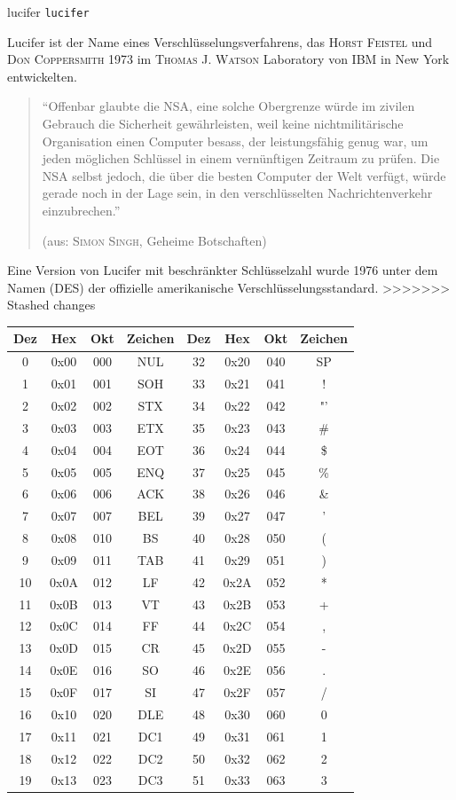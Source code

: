 \documentclass[%
<<<<<<< Updated upstream
11pt,%
twoside,%
titlepage,%
german,%
headsepline%
]{scrartcl}
\begin{document}
\begin{lsg}{lucifer}
    \texttt{lucifer}
\end{lsg}

Lucifer ist der Name eines Ver\-schlüs\-se\-lungs\-ver\-fahrens, das \textsc{Horst Feistel} und \textsc{Don Coppersmith} 1973 im \textsc{Thomas J. Watson} Laboratory von IBM in New York entwickelten.

\begin{quote}
\enquote{Offenbar glaubte die NSA, eine solche Obergrenze würde im zivilen Gebrauch die Sicherheit gewährleisten, weil keine nichtmilitärische Organisation einen Computer besass, der leistungsfähig genug war, um jeden möglichen Schlüssel in einem vernünftigen Zeitraum zu prüfen. Die NSA selbst jedoch, die über die besten Computer der Welt verfügt, würde gerade noch in der Lage sein, in den verschlüsselten Nachrichtenverkehr einzubrechen.}

(aus: \textsc{Simon Singh}, Geheime Botschaften)
\end{quote}

Eine Version von Lucifer mit beschränkter Schlüsselzahl wurde 1976 unter dem Namen  (DES) der offizielle amerikanische Verschlüsselungsstandard.
>>>>>>> Stashed changes

\begin{longtable}{|c|c|c|c||c|c|c|c|}
\hline
Dez & Hex & Okt & Zeichen & Dez & Hex & Okt & Zeichen\\
\hline
0 & 0x00 & 000 & NUL & 32 & 0x20 & 040 & SP\\
1 & 0x01 & 001 & SOH & 33 & 0x21 & 041 & ! \\
2 & 0x02 & 002 & STX & 34 & 0x22 & 042 & "'\\
3 & 0x03 & 003 & ETX & 35 & 0x23 & 043 & \# \\
4 & 0x04 & 004 & EOT & 36 & 0x24 & 044 & \$ \\
5 & 0x05 & 005 & ENQ & 37 & 0x25 & 045 & \% \\
6 & 0x06 & 006 & ACK & 38 & 0x26 & 046 & \& \\
7 & 0x07 & 007 & BEL & 39 & 0x27 & 047 & ' \\
8 & 0x08 & 010 & BS & 40 & 0x28 & 050 & (  \\
9 & 0x09 & 011 & TAB & 41 & 0x29 & 051 &  ) \\
10 & 0x0A & 012 & LF & 42 & 0x2A & 052 & * \\
11 & 0x0B & 013 & VT & 43 & 0x2B & 053 & + \\
12 & 0x0C & 014 & FF & 44 & 0x2C & 054 & , \\
13 & 0x0D & 015 & CR & 45 & 0x2D & 055 & - \\
14 & 0x0E & 016 & SO & 46 & 0x2E & 056 & . \\
15 & 0x0F & 017 & SI & 47 & 0x2F & 057 & / \\
16 & 0x10 & 020 & DLE & 48 & 0x30 & 060 & 0 \\
17 & 0x11 & 021 & DC1 & 49 & 0x31 & 061 & 1 \\
18 & 0x12 & 022 & DC2 & 50 & 0x32 & 062 & 2 \\
19 & 0x13 & 023 & DC3 & 51 & 0x33 & 063 & 3 \\
\hline
\end{longtable}
\end{document}
